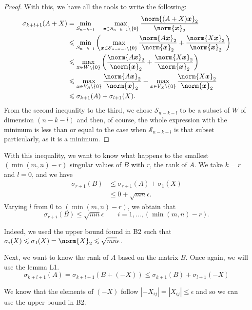 \documentclass[11pt]{article}
\newcommand{\abs}[1]{\left\lvert#1\right\lvert}
\newcommand{\snorm}[1]{\norm{#1}_2} %
\begin{document}
\begin{proof}
With this, we have all the tools to write the following:
\begin{align*}
\sigma_{k+l + 1}(A+X) &= \min_{\mathcal{S}_{n-k-l}} \quad \max_{\bm{x} \in \mathcal{S}_{n-k-l} \setminus \{0\}} \frac{\snorm{(A+X)\bm{x}}}{\snorm{\bm{x}}}\\
&\leqslant \min_{\mathcal{S}_{n-k-l}} \left( \max_{\bm{x} \in \mathcal{S}_{n-k-l} \setminus \{0\}} \frac{\snorm{A\bm{x}}}{\snorm{\bm{x}}} + \frac{\snorm{X\bm{x}}}{\snorm{\bm{x}}} \right)\\
&\leqslant \max_{\bm{x} \in W \setminus \{0\}}\left( \frac{\snorm{A\bm{x}}}{\snorm{\bm{x}}} + \frac{\snorm{X\bm{x}}}{\snorm{\bm{x}}}\right)\\
&\leqslant \max_{\bm{x} \in V_A \setminus \{0\}} \frac{\snorm{A\bm{x}}}{\snorm{\bm{x}}} + \max_{\bm{x} \in V_X \setminus \{0\}} \frac{\snorm{X\bm{x}}}{\snorm{\bm{x}}}\\
&\leqslant \sigma_{k+1}(A) + \sigma_{l+1}(X).
\end{align*}
From the second inequality to the third, we chose $\mathcal{S}_{n-k-l}$ to be a subset of \(W\) of dimension $(n-k-l)$ and then, of course, the whole expression with the minimum is less than or equal to the case when $\mathcal{S}_{n-k-l}$ is that subset particularly, as it is a minimum.
\end{proof}

With this inequality, we want to know what happens to the smallest $(\min(m,n)-r)$ singular values of \(B\) with \(r\), the rank of \(A\).
We take $k=r$ and $l=0$, and we have 
\begin{align}
\sigma_{r+1}(B) &\leqslant \sigma_{r+1}(A) + \sigma_{1}(X)\\
&\leqslant 0 + \sqrt{mn}\epsilon.
\end{align}
Varying $l$ from $0$ to $(\min(m,n)-r)$, we obtain that 
\[\sigma_{r+i}(B) \leqslant \sqrt{mn}\epsilon \qquad i = 1, \dots, (\min(m,n)-r).
\]

Indeed, we used the upper bound found in B2 such that $\sigma_i(X)\leqslant \sigma_1(X)= \snorm{X}\leqslant \sqrt{mn}\epsilon$.

Next, we want to know the rank of \(A\) based on the matrix \(B\). Once again, we will use the lemma L1.
\[
\sigma_{k+l + 1}(A) =  \sigma_{k+l + 1}(B+(-X))
\leqslant \sigma_{k+1}(B) + \sigma_{l+1}(-X)
\]

We know that the elements of $(-X)$ follow $ \abs{-X_{ij}} = \abs{X_{ij}} \leqslant \epsilon$ and so we can use the upper bound in B2.
\end{document}
